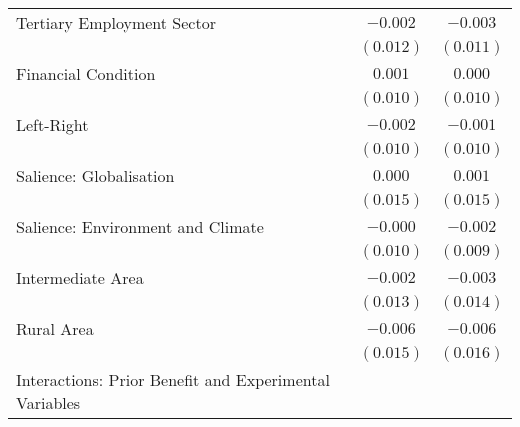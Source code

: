\begin{center}
\begin{tiny}
\begin{longtable}{l@{} c@{} c@{}}
\quad Tertiary Employment Sector                                                                       & $-0.002$         & $-0.003$         \\
                                                                                                       & $(0.012)$        & $(0.011)$        \\
\quad Financial Condition                                                                              & $0.001$          & $0.000$          \\
                                                                                                       & $(0.010)$        & $(0.010)$        \\
\quad Left-Right                                                                                       & $-0.002$         & $-0.001$         \\
                                                                                                       & $(0.010)$        & $(0.010)$        \\
\quad Salience: Globalisation                                                                          & $0.000$          & $0.001$          \\
                                                                                                       & $(0.015)$        & $(0.015)$        \\
\quad Salience: Environment and Climate                                                                & $-0.000$         & $-0.002$         \\
                                                                                                       & $(0.010)$        & $(0.009)$        \\
\quad Intermediate Area                                                                                & $-0.002$         & $-0.003$         \\
                                                                                                       & $(0.013)$        & $(0.014)$        \\
\quad Rural Area                                                                                       & $-0.006$         & $-0.006$         \\
                                                                                                       & $(0.015)$        & $(0.016)$        \\
Interactions: Prior Benefit and Experimental Variables                                                 &                  &                  \\

\end{longtable}
\end{tiny}
\end{center}
